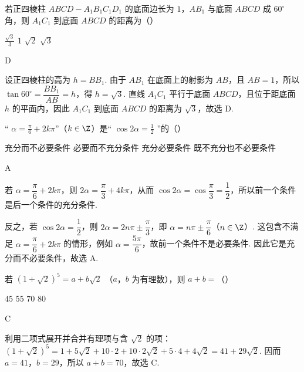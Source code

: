 \begin{problem}
若正四棱柱 \(ABCD - A_{1}B_{1}C_{1}D_{1}\) 的底面边长为 \(1\)，\(AB_{1}\) 与底面 \(ABCD\) 成 \(60^{\circ}\) 角，则 \(A_{1}C_{1}\) 到底面 \(ABCD\) 的距离为（\quad）

\choices
    {\(\frac{\sqrt{3}}{3}\)}
    {\(1\)}
    {\(\sqrt{2}\)}
    {\(\sqrt{3}\)}

\begin{answer}
D
\end{answer}

\begin{solution}
设正四棱柱的高为 \(h=BB_1\). 由于 \(AB_1\) 在底面上的射影为 \(AB\)，且 \(AB=1\)，所以 \(\tan 60^\circ=\dfrac{BB_1}{AB}=h\)，得 \(h=\sqrt3\). 直线 \(A_1C_1\) 平行于底面 \(ABCD\)，且位于距底面 \(h\) 的平面内，因此 \(A_1C_1\) 到底面 \(ABCD\) 的距离为 \(\sqrt3\)，故选 D.
\end{solution}
\end{problem}

\begin{problem}
“ \( \alpha=\frac{\pi}{6}+2k\pi \)”（\(k\in\Z\)）是“ \( \cos2\alpha=\frac{1}{2} \) ”的（\quad）

\choices
    {充分而不必要条件}
    {必要而不充分条件}
    {充分必要条件}
    {既不充分也不必要条件}

\begin{answer}
A
\end{answer}

\begin{solution}
若 \(\alpha=\dfrac\pi6+2k\pi\)，则 \(2\alpha=\dfrac\pi3+4k\pi\)，从而 \(\cos2\alpha=\cos\dfrac\pi3=\dfrac12\)，所以前一个条件是后一个条件的充分条件.

反之，若 \(\cos2\alpha=\dfrac12\)，则 \(2\alpha=2n\pi\pm\dfrac\pi3\)，即 \(\alpha=n\pi\pm\dfrac\pi6\)（\(n\in\Z\)）. 这包含不满足 \(\alpha=\dfrac\pi6+2k\pi\) 的情形，例如 \(\alpha=\dfrac{5\pi}{6}\)，故前一个条件不是必要条件. 因此它是充分而不必要条件，故选 A.
\end{solution}
\end{problem}

\begin{problem}
若 \(\left(1 + \sqrt{2}\right)^5 = a + b\sqrt{2}\) （\(a\)，\(b\) 为有理数），则 \(a + b =\)（\quad）

\choices
    {\(45\)}
    {\(55\)}
    {\(70\)}
    {\(80\)}

\begin{answer}
C
\end{answer}

\begin{solution}
利用二项式展开并合并有理项与含 \(\sqrt2\) 的项：\((1+\sqrt2)^5=1+5\sqrt2+10\cdot2+10\cdot2\sqrt2+5\cdot4+4\sqrt2=41+29\sqrt2\). 因而 \(a=41\)，\(b=29\)，所以 \(a+b=70\)，故选 C.
\end{solution}
\end{problem}


